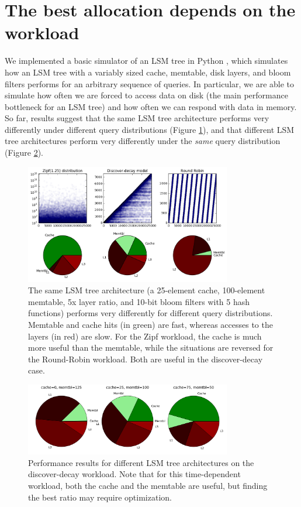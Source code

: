 \documentclass{sig-alternate-05-2015}
\begin{document}
\section{The best allocation depends on the workload}

We implemented a basic simulator of an LSM tree in Python \cite{lsmulator},
which simulates how an LSM tree with a variably sized cache, memtable, disk
layers, and bloom filters performs for an arbitrary sequence of queries. In
particular, we are able to simulate how often we are forced to access data on
disk (the main performance bottleneck for an LSM tree) and how often we can
respond with data in memory. So far, results suggest that the same LSM tree
architecture performs very differently under different query distributions
(Figure \ref{fig:sametree-diffqs}), and that different LSM tree architectures
perform very differently under the \textit{same} query distribution (Figure
\ref{fig:sameqs-difftree}). 

\begin{figure}[!htb]
\begin{center}
\includegraphics[width=9cm]{sametree-diffqs.png}
\end{center}
\caption{The same LSM tree architecture (a 25-element cache, 100-element
memtable, 5x layer ratio, and 10-bit bloom filters with 5 hash functions)
performs very differently for different query distributions. Memtable and cache
hits (in green) are fast, whereas accesses to the layers (in red) are slow. For
the Zipf workload, the cache is much more useful than the memtable, while the
situations are reversed for the Round-Robin workload. Both are useful in the
discover-decay case.}
\label{fig:sametree-diffqs}
\end{figure}

\begin{figure}[!htb]
\begin{center}
\includegraphics[width=9cm]{sameqs-difftree.png}
\end{center}
\caption{Performance results for different LSM tree architectures on the
discover-decay workload. Note that for this time-dependent workload, both the
cache and the memtable are useful, but finding the best ratio may require
optimization.}
\label{fig:sameqs-difftree}
\end{figure}
\end{document}
